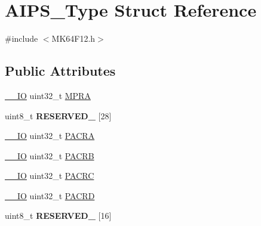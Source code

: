\hypertarget{structAIPS__Type}{}\section{A\+I\+P\+S\+\_\+\+Type Struct Reference}
\label{structAIPS__Type}


{\ttfamily \#include $<$M\+K64\+F12.\+h$>$}

\subsection*{Public Attributes}
\begin{DoxyCompactItemize}
\item 
\hyperlink{core__sc300_8h_aec43007d9998a0a0e01faede4133d6be}{\+\_\+\+\_\+\+IO} uint32\+\_\+t \hyperlink{structAIPS__Type_ae9d17ee3a5debdbbdd6f8e6f90eb6466}{M\+P\+RA}
\item 
uint8\+\_\+t {\bfseries R\+E\+S\+E\+R\+V\+E\+D\+\_} \mbox{[}28\mbox{]}\hypertarget{structAIPS__Type_a4aeb501f40bb462c41f8ccf4992de3c2}{}\label{structAIPS__Type_a4aeb501f40bb462c41f8ccf4992de3c2}

\item 
\hyperlink{core__sc300_8h_aec43007d9998a0a0e01faede4133d6be}{\+\_\+\+\_\+\+IO} uint32\+\_\+t \hyperlink{structAIPS__Type_a2c39e8dbbb58b9ad0caa11934c0c9fa2}{P\+A\+C\+RA}
\item 
\hyperlink{core__sc300_8h_aec43007d9998a0a0e01faede4133d6be}{\+\_\+\+\_\+\+IO} uint32\+\_\+t \hyperlink{structAIPS__Type_a09845073faa73e743dcb3a4f47a51b19}{P\+A\+C\+RB}
\item 
\hyperlink{core__sc300_8h_aec43007d9998a0a0e01faede4133d6be}{\+\_\+\+\_\+\+IO} uint32\+\_\+t \hyperlink{structAIPS__Type_a0df98dbca629285b81f2665f24de313c}{P\+A\+C\+RC}
\item 
\hyperlink{core__sc300_8h_aec43007d9998a0a0e01faede4133d6be}{\+\_\+\+\_\+\+IO} uint32\+\_\+t \hyperlink{structAIPS__Type_aace64c8c28f2e8b815bdc2db2d004799}{P\+A\+C\+RD}
\item 
uint8\+\_\+t {\bfseries R\+E\+S\+E\+R\+V\+E\+D\+\_} \mbox{[}16\mbox{]}\hypertarget{structAIPS__Type_abb3737fee54ffb6fea75fc248db3086f}{}\label{structAIPS__Type_abb3737fee54ffb6fea75fc248db3086f}


\end{DoxyCompactItemize}
